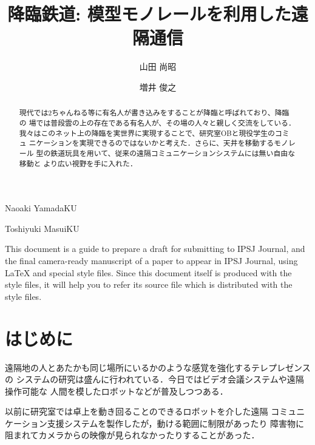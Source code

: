 \documentclass[submit,techreq]{ipsj}
\begin{document}
\title{降臨鉄道: 模型モノレールを利用した遠隔通信}


\author{山田 尚昭}{Naoaki Yamada}{KU}
\author{増井 俊之}{Toshiyuki Masui}{KU}

\begin{abstract}
現代では2ちゃんねる等に有名人が書き込みをすることが降臨と呼ばれており、降臨の
場では普段雲の上の存在である有名人が、その場の人々と親しく交流をしている．
我々はこのネット上の降臨を実世界に実現することで、研究室OBと現役学生のコミュ
ニケーションを実現できるのではないかと考えた．さらに、天井を移動するモノレール
型の鉄道玩具を用いて、従来の遠隔コミュニケーションシステムには無い自由な移動と
より広い視野を手に入れた．
\end{abstract}


%
\begin{eabstract}
This document is a guide to prepare a draft for submitting to IPSJ
Journal, and the final camera-ready manuscript of a paper to appear in
IPSJ Journal, using {\LaTeX} and special style files.  Since this
document itself is produced with the style files, it will help you to
refer its source file which is distributed with the style files.
\end{eabstract}
%

\maketitle

\section{はじめに}

遠隔地の人とあたかも同じ場所にいるかのような感覚を強化するテレプレゼンスの
システムの研究は盛んに行われている．今日ではビデオ会議システムや遠隔操作可能な
人間を模したロボットなどが普及しつつある．

以前に研究室では卓上を動き回ることのできるロボットを介した遠隔
コミュニケーション支援システムを製作したが，動ける範囲に制限があったり
障害物に阻まれてカメラからの映像が見られなかったりすることがあった．
\end{document}
